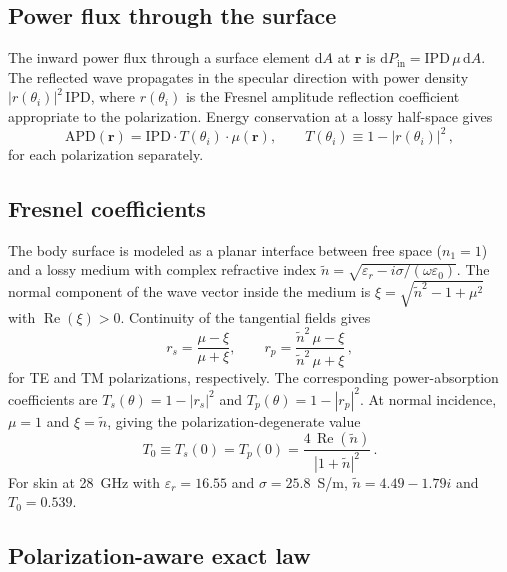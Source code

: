 \documentclass[journal,twocolumn,10pt]{IEEEtran}
\theoremstyle{plain}
\newcommand{\rr}{\mathbf{r}}
\newcommand{\IPD}{\mathrm{IPD}}
\newcommand{\APD}{\mathrm{APD}}
\newcommand{\ntilde}{\tilde{n}}
\newcommand{\diff}{\mathrm{d}}
\DeclareMathOperator{\RE}{Re}
\begin{document}
\subsection{Power flux through the surface}

The inward power flux through a surface element $\diff A$ at $\rr$
is $\diff P_{\mathrm{in}} = \IPD\,\mu\,\diff A$. The reflected wave
propagates in the specular direction with power density
$|r(\theta_i)|^2\,\IPD$, where $r(\theta_i)$ is the Fresnel amplitude
reflection coefficient appropriate to the polarization. Energy
conservation at a lossy half-space gives
\begin{equation}\label{eq:Sab-pol}
  \APD(\rr) = \IPD \cdot T(\theta_i) \cdot \mu(\rr),
  \qquad T(\theta_i) \equiv 1 - |r(\theta_i)|^2\, ,
\end{equation}
for each polarization separately.

\subsection{Fresnel coefficients}

The body surface is modeled as a planar interface between free
space ($n_1 = 1$) and a lossy medium with complex refractive index
$\ntilde = \sqrt{\varepsilon_r - i\sigma/(\omega\varepsilon_0)}$. The
normal component of the wave vector inside the medium is
$\xi = \sqrt{\ntilde^2 - 1 + \mu^2}$ with $\RE(\xi) > 0$. Continuity
of the tangential fields gives
\begin{equation}\label{eq:rs-rp}
  r_s = \frac{\mu - \xi}{\mu + \xi},
  \qquad
  r_p = \frac{\ntilde^2\,\mu - \xi}{\ntilde^2\,\mu + \xi}\, ,
\end{equation}
for TE and TM polarizations, respectively. The corresponding
power-absorption
coefficients are $T_s(\theta) = 1 - |r_s|^2$ and
$T_p(\theta) = 1 - |r_p|^2$. At normal incidence, $\mu = 1$ and
$\xi = \ntilde$, giving the polarization-degenerate value
\begin{equation}\label{eq:T0}
  T_0 \equiv T_s(0) = T_p(0) = \frac{4\,\RE(\ntilde)}{|1+\ntilde|^2}\, .
\end{equation}
For skin at 28~GHz with $\varepsilon_r = 16.55$ and
$\sigma = 25.8$~S/m, $\ntilde = 4.49 - 1.79i$ and $T_0 = 0.539$.

\subsection{Polarization-aware exact law}\label{subsec:exact-law}
\end{document}

